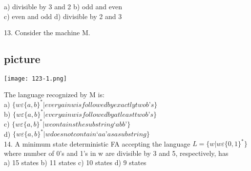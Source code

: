 \documentclass{article}
\begin{document}
\vspace*{0.2cm}
\hspace{0.5cm}
a) divisible by 3 and 2     \hspace{0.5cm}   b) odd and even \\
\hspace{0.5cm}
c) even and odd             \hspace{1cm}   d) divisible by 2 and 3 \\
\vspace*{0.2cm}

\vspace*{0.2cm}

13. Consider the machine M.\\

\begin{center}
\section{picture}
\texttt{[image: 123-1.png]}
\end{center}

\vspace*{0.2cm}
\hspace{0.5cm}
The language recognized by M is:\\

\vspace*{0.2cm}
\hspace{0.5cm}
a) $\{w \varepsilon\{a, b\}^{*} | every a in w is followed by exactly two b’s\}$\\
\hspace{0.5cm}
b) $\{w \varepsilon\{a, b\}^{*} | every a in w is followed by at least two b’s\}$\\
\hspace{0.5cm}
c) $\{w \varepsilon\{a, b\}^{*} | w contains the substring ‘abb’\}$\\
\hspace{0.5cm}
d) $\{w \varepsilon\{a, b\}^{*} | w does not contain ‘aa’ as a substring\}$\\


14. A minimum state deterministic FA accepting the language $L = \{w | w \varepsilon \{0, 1\}^{*}\}$ where number of
0’s and 1’s in w are divisible by 3 and 5, respectively, has\\

\vspace*{0.2cm}
\hspace{0.5cm}
a) 15 states  \hspace*{0.5cm}  b) 11 states  \hspace*{0.5cm}   c) 10 states  \hspace*{0.5cm}  d) 9 states \\
\vspace*{0.2cm}
\end{document}
